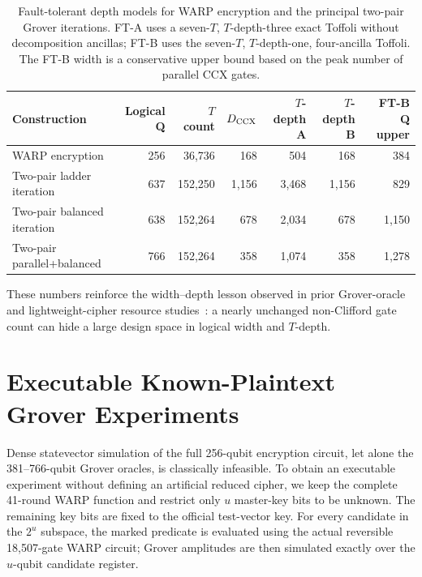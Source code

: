 \documentclass[10pt,a4paper]{article}
\begin{document}
\begin{table}[t]
\centering
\caption{Fault-tolerant depth models for WARP encryption and the principal two-pair Grover iterations. FT-A uses a seven-$T$, $T$-depth-three exact Toffoli without decomposition ancillas; FT-B uses the seven-$T$, $T$-depth-one, four-ancilla Toffoli. The FT-B width is a conservative upper bound based on the peak number of parallel CCX gates.}
\label{tab:ft_depth_models}
\scriptsize
\begin{tabular}{lrrrrrr}
\toprule
Construction & Logical Q & $T$ count & $D_{\rm CCX}$ & $T$-depth A & $T$-depth B & FT-B Q upper\\
\midrule
WARP encryption & 256 & 36,736 & 168 & 504 & 168 & 384\\
Two-pair ladder iteration & 637 & 152,250 & 1,156 & 3,468 & 1,156 & 829\\
Two-pair balanced iteration & 638 & 152,264 & 678 & 2,034 & 678 & 1,150\\
Two-pair parallel+balanced & 766 & 152,264 & 358 & 1,074 & 358 & 1,278\\
\bottomrule
\end{tabular}
\end{table}

These numbers reinforce the width--depth lesson observed in prior Grover-oracle and lightweight-cipher resource studies~\cite{Jaques2020,Rahman2022}: a nearly unchanged non-Clifford gate count can hide a large design space in logical width and $T$-depth.
\FloatBarrier

\section{Executable Known-Plaintext Grover Experiments}

Dense statevector simulation of the full 256-qubit encryption circuit, let alone the 381--766-qubit Grover oracles, is classically infeasible. To obtain an executable experiment without defining an artificial reduced cipher, we keep the complete 41-round WARP function and restrict only $u$ master-key bits to be unknown. The remaining key bits are fixed to the official test-vector key. For every candidate in the $2^u$ subspace, the marked predicate is evaluated using the actual reversible 18,507-gate WARP circuit; Grover amplitudes are then simulated exactly over the $u$-qubit candidate register.
\end{document}
